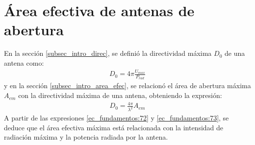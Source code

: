 \section{Área efectiva de antenas de abertura}
\label{sec_fundamentos_area_ef_ant_aber}

En la sección \ref{subsec_intro_direc}, se definió la directividad máxima $D_0$ de una antena como:
\begin{align}
D_0  = 4\pi\frac{U_{max}}{P_{rad}}
\label{ec_fundamentos:72}
\end{align}
y en la sección \ref{subsec_intro_area_efec}, se relacionó el área de abertura máxima $A_{em}$ con la directividad máxima de una antena, obteniendo la expresión:
\begin{align}
D_0  = \frac{4\pi}{\lambda^2}A_{em}
\label{ec_fundamentos:73}
\end{align}
A partir de las expresiones \eqref{ec_fundamentos:72} y \eqref{ec_fundamentos:73}, se deduce que el área efectiva máxima está relacionada con la intensidad de radiación máxima y la potencia radiada por la antena.

